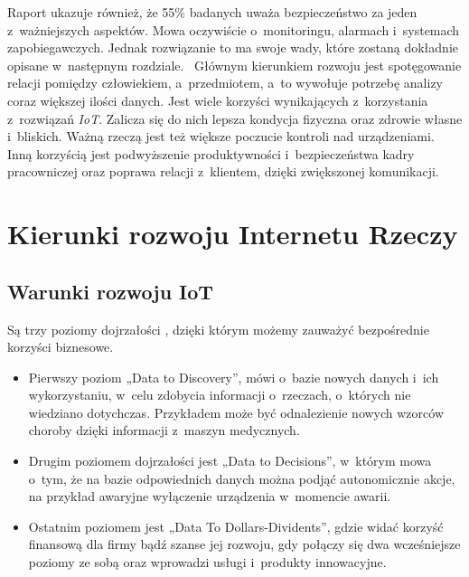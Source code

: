\documentclass{xmgr}
\begin{document}
	Raport ukazuje również, że 55\% badanych uważa bezpieczeństwo za jeden z~ważniejszych aspektów. Mowa oczywiście o~monitoringu, alarmach i~systemach zapobiegawczych. Jednak rozwiązanie to ma swoje wady, które zostaną dokładnie opisane w~następnym rozdziale.~ \cite{Gfk:2015:CMC}
	Głównym kierunkiem rozwoju jest spotęgowanie relacji pomiędzy człowiekiem, a~przedmiotem, a~to wywołuje potrzebę analizy coraz większej ilości danych. 
	Jest wiele korzyści wynikających z~korzystania z~rozwiązań \emph{IoT}. Zalicza się do nich lepsza kondycja fizyczna oraz zdrowie własne i~bliskich. Ważną rzeczą jest też większe poczucie kontroli nad urządzeniami. Inną korzyścią jest podwyższenie produktywności i~bezpieczeństwa kadry pracowniczej oraz poprawa relacji z~klientem, dzięki zwiększonej komunikacji.
\chapter{Kierunki rozwoju Internetu Rzeczy}

\section{Warunki rozwoju IoT}
	Są trzy poziomy dojrzałości \cite{RP:2015:IOTPL}, dzięki którym możemy zauważyć bezpośrednie korzyści biznesowe. 
\begin{itemize}
\item Pierwszy poziom „Data to Discovery”, mówi o~bazie nowych danych i~ich wykorzystaniu, w~celu  zdobycia informacji o~rzeczach, o~których nie wiedziano dotychczas. Przykładem może być odnalezienie nowych wzorców choroby dzięki informacji z~maszyn medycznych. 
\item Drugim poziomem dojrzałości jest „Data to Decisions”, w~którym mowa o~tym, że na bazie odpowiednich danych można podjąć autonomicznie akcje, na przykład awaryjne wyłączenie urządzenia w~momencie awarii. 
\item Ostatnim poziomem jest „Data To Dollars-Dividents”, gdzie widać korzyść finansową dla firmy bądź szanse jej rozwoju, gdy połączy się dwa wcześniejsze poziomy ze sobą oraz wprowadzi usługi i~produkty innowacyjne.
\end{itemize}
 
\end{document}

